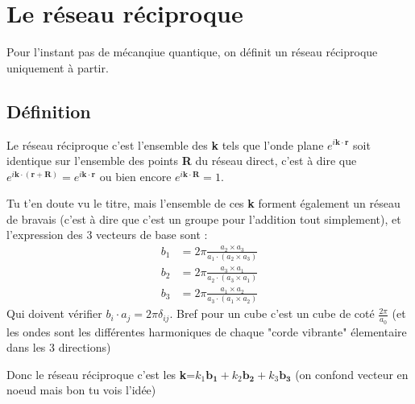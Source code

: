 \documentclass[a4paper]{report}
\begin{document}
  \chapter{Le réseau réciproque}
  Pour l'instant pas de mécanqiue quantique, on définit un réseau réciproque uniquement à partir.
  \section{Définition}
  Le réseau réciproque c'est l'ensemble des \textbf{k} tels que l'onde plane $e^{i\mathbf{k}\cdot\mathbf{r}}$ soit identique sur l'ensemble des points \textbf{R} du réseau direct, c'est à dire que $e^{i\mathbf{k}\cdot\mathbf{(r+R)}}=e^{i\mathbf{k}\cdot\mathbf{r}}$ ou bien encore $e^{i\mathbf{k}\cdot\mathbf{R}}=1$.
  
  Tu t'en doute vu le titre, mais l'ensemble de ces \textbf{k} forment également un réseau de bravais (c'est à dire que c'est un groupe pour l'addition tout simplement), et l'expression des 3 vecteurs de base sont :
  \begin{align*}
  b_1&=2\pi \frac{a_2 \times a_3}{a_1 \cdot (a_2 \times a_3)} \\
  b_2&=2\pi \frac{a_3 \times a_1}{a_2 \cdot (a_3 \times a_1)} \\
  b_3&=2\pi \frac{a_1 \times a_2}{a_3 \cdot (a_1 \times a_2)}
  \end{align*}
  Qui doivent vérifier $b_i \cdot a_j = 2\pi \delta_{ij}$. Bref pour un cube c'est un cube de coté $\frac{2\pi}{a_0}$ (et les ondes sont les différentes harmoniques de chaque "corde vibrante" élementaire dans les 3 directions)
  
  Donc le réseau réciproque c'est les \textbf{k}=$k_1\mathbf{b_1}+k_2\mathbf{b_2}+k_3\mathbf{b_3}$ (on confond vecteur en noeud mais bon tu vois l'idée)
    
\end{document}
